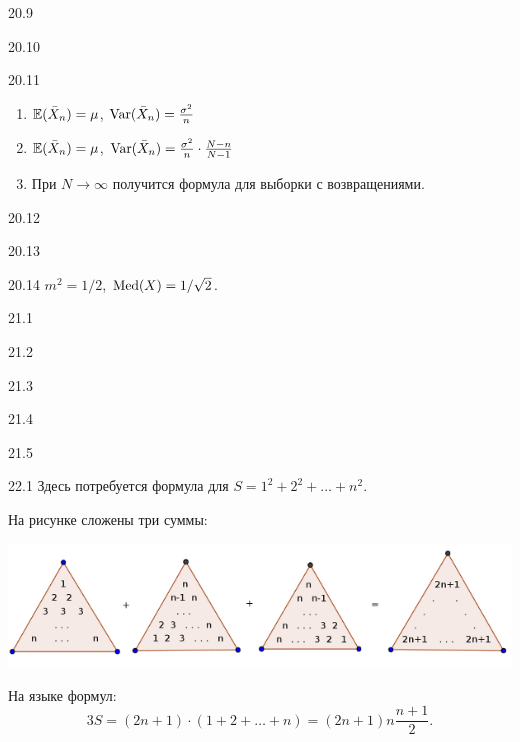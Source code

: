 \protect \hypertarget {soln:20.9}{}
\begin{solution}{{20.9}}
\end{solution}
\protect \hypertarget {soln:20.10}{}
\begin{solution}{{20.10}}
\end{solution}
\protect \hypertarget {soln:20.11}{}
\begin{solution}{{20.11}}
\begin{enumerate}
\item $\mathbb{E}(\bar{X}_n) = \mu$, $\operatorname{Var}(\bar{X}_n) = \frac{\sigma^2}{n}$
\item $\mathbb{E}(\bar{X}_n) = \mu$, $\operatorname{Var}(\bar{X}_n) = \frac{\sigma^2}{n} \cdot \frac{N-n}{N-1}$
\item При $N\to \infty$ получится формула для выборки с возвращениями.
\end{enumerate}
\end{solution}
\protect \hypertarget {soln:20.12}{}
\begin{solution}{{20.12}}
\end{solution}
\protect \hypertarget {soln:20.13}{}
\begin{solution}{{20.13}}
\end{solution}
\protect \hypertarget {soln:20.14}{}
\begin{solution}{{20.14}}
  $m^2=1/2$, $\operatorname{Med}(X) = 1/\sqrt{2}$.
\end{solution}
\protect \hypertarget {soln:21.1}{}
\begin{solution}{{21.1}}
\end{solution}
\protect \hypertarget {soln:21.2}{}
\begin{solution}{{21.2}}
\end{solution}
\protect \hypertarget {soln:21.3}{}
\begin{solution}{{21.3}}
\end{solution}
\protect \hypertarget {soln:21.4}{}
\begin{solution}{{21.4}}
\end{solution}
\protect \hypertarget {soln:21.5}{}
\begin{solution}{{21.5}}
\end{solution}
\protect \hypertarget {soln:22.1}{}
\begin{solution}{{22.1}}
Здесь потребуется формула для $S=1^2+2^2 + \ldots + n^2$.

На рисунке сложены три суммы:

\begin{minipage}{0.8\textwidth}
\includegraphics[width=\textwidth]{figure/triangle-proof.png}
\end{minipage}

На языке формул:
\[
  3S = (2n+1) \cdot (1 + 2 + \ldots + n) = (2n+1)n\frac{n+1}{2}.
\]
\end{solution}
